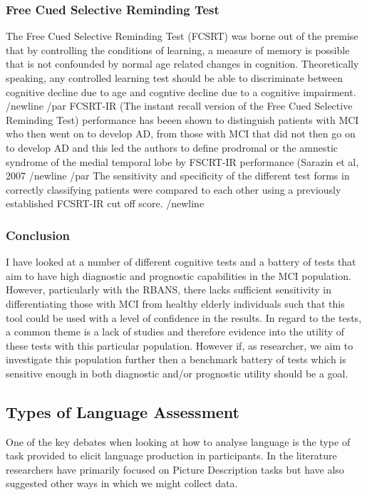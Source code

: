 \documentclass{article}
\begin{document}
\subsubsection{Free Cued Selective Reminding Test}
The Free Cued Selective Reminding Test (FCSRT) was borne out of the premise that by controlling the conditions of learning, a measure of memory is possible that is not confounded by normal age related changes in cognition. Theoretically speaking, any controlled learning test should be able to discriminate between cognitive decline due to age and cogntive decline due to a cognitive impairment. /newline
/par
FCSRT-IR (The instant recall version of the Free Cued Selective Reminding Test) performance has beeen shown to distinguish patients with MCI who then went on to develop AD, from those with MCI that did not then go on to develop AD and this led the authors to define prodromal or the amnestic syndrome of the medial temporal lobe by FSCRT-IR performance (Sarazin et al, 2007 /newline
/par
The sensitivity and specificity of the different test forms in correctly classifying patients were compared to each other using a previously established FCSRT-IR cut off score. /newline
\subsubsection{Conclusion}
I have looked at a number of different cognitive tests and a battery of tests that aim to have high diagnostic and prognostic capabilities in the MCI population. However, particularly with the RBANS, there lacks sufficient sensitivity in differentiating those with MCI from healthy elderly individuals such that this tool could be used with a level of confidence in the results. In regard to the tests, a common theme is a lack of studies and therefore evidence into the utility of these tests with this particular population. However if, as researcher, we aim to investigate this population further then a benchmark battery of tests which is sensitive enough in both diagnostic and/or prognostic utility should be a goal. 

\subsection{Types of Language Assessment}
One of the key debates when looking at how to analyse language is the type of task provided to elicit language production in participants. In the literature researchers have primarily focused on Picture Description tasks but have also suggested other ways in which we might collect data. \newline
\par
\end{document}
